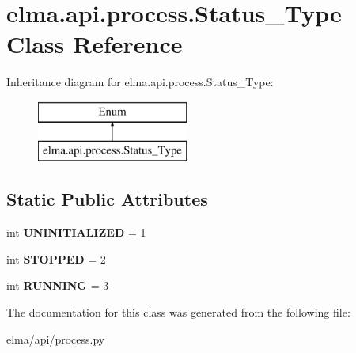 \hypertarget{classelma_1_1api_1_1process_1_1Status__Type}{}\section{elma.\+api.\+process.\+Status\+\_\+\+Type Class Reference}
\label{classelma_1_1api_1_1process_1_1Status__Type}
Inheritance diagram for elma.\+api.\+process.\+Status\+\_\+\+Type\+:\begin{figure}[H]
\begin{center}
\leavevmode
\includegraphics[height=2.000000cm]{classelma_1_1api_1_1process_1_1Status__Type}
\end{center}
\end{figure}
\subsection*{Static Public Attributes}
\begin{DoxyCompactItemize}
\item 
\mbox{\label{classelma_1_1api_1_1process_1_1Status__Type_a3931e54de54d07963d9f7a2896964231}} 
int {\bfseries U\+N\+I\+N\+I\+T\+I\+A\+L\+I\+Z\+ED} = 1
\item 
\mbox{\label{classelma_1_1api_1_1process_1_1Status__Type_a3069b069e3cd2d3a36a471a1d84d1738}} 
int {\bfseries S\+T\+O\+P\+P\+ED} = 2
\item 
\mbox{\label{classelma_1_1api_1_1process_1_1Status__Type_acad68ee8aaa785f6adabec51c3c19207}} 
int {\bfseries R\+U\+N\+N\+I\+NG} = 3
\end{DoxyCompactItemize}


The documentation for this class was generated from the following file\+:\begin{DoxyCompactItemize}
\item 
elma/api/process.\+py\end{DoxyCompactItemize}
